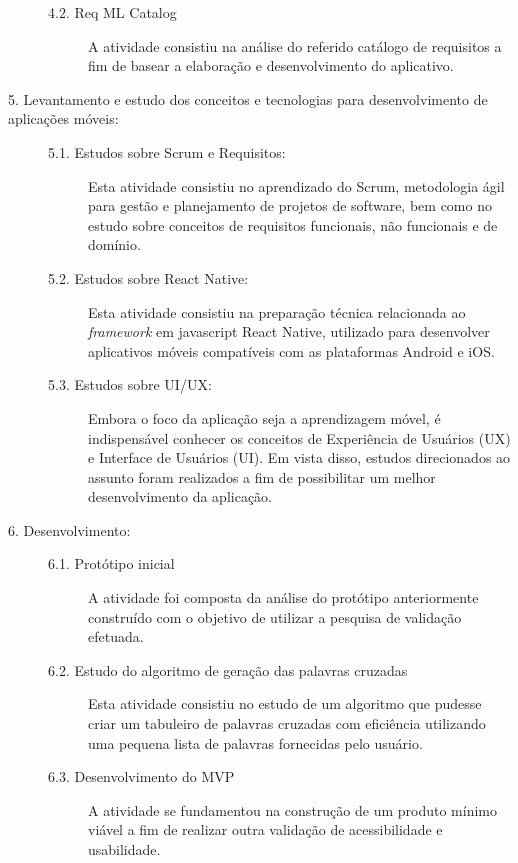\begin{description}
\begin{description}
    \item[4.2. Req ML Catalog]
    A atividade consistiu na análise do referido catálogo de requisitos a fim de basear a elaboração e desenvolvimento do aplicativo.
\end{description}


\item[5. Levantamento e estudo dos conceitos e tecnologias para desenvolvimento de aplicações móveis:]
\hfill

\begin{description}
\item[5.1. Estudos sobre Scrum e Requisitos:] Esta atividade consistiu no aprendizado do Scrum, metodologia ágil para gestão e planejamento de projetos de software, bem como no estudo sobre conceitos de requisitos funcionais, não funcionais e de domínio.

\item[5.2. Estudos sobre React Native:] Esta atividade consistiu na preparação técnica relacionada ao \textit{framework} em javascript React Native, utilizado para desenvolver aplicativos móveis compatíveis com as plataformas Android e iOS.

\item[5.3. Estudos sobre UI/UX:] Embora o foco da aplicação seja a aprendizagem móvel, é indispensável conhecer os conceitos de Experiência de Usuários (UX) e Interface de Usuários (UI). Em vista disso, estudos direcionados ao assunto foram realizados a fim de possibilitar um melhor desenvolvimento da aplicação.

\end{description}

\item[6. Desenvolvimento:]
\hfill

\begin{description}
    \item[6.1. Protótipo inicial]
    A atividade foi composta da análise do protótipo anteriormente construído com o objetivo de utilizar a pesquisa de validação efetuada.
    
    \item[6.2. Estudo do algoritmo de geração das palavras cruzadas]
    Esta atividade consistiu no estudo de um algoritmo que pudesse criar um tabuleiro de palavras cruzadas com eficiência utilizando uma pequena lista de palavras fornecidas pelo usuário.
    
    \item[6.3. Desenvolvimento do MVP] 
    A atividade se fundamentou na construção de um produto mínimo viável a fim de realizar outra validação de acessibilidade e usabilidade.
\end{description}

\end{description}
